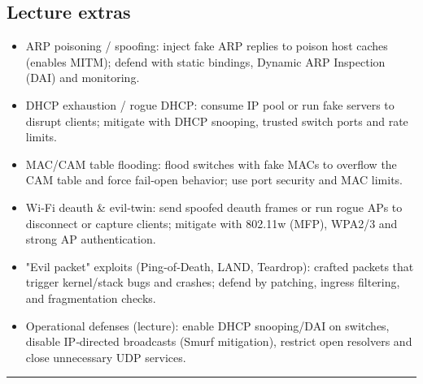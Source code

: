 \documentclass{article}
\begin{document}
\subsection{Lecture extras}
\begin{itemize}
  \item ARP poisoning / spoofing: inject fake ARP replies to poison host caches (enables MITM); defend with static bindings, Dynamic ARP Inspection (DAI) and monitoring.
  \item DHCP exhaustion / rogue DHCP: consume IP pool or run fake servers to disrupt clients; mitigate with DHCP snooping, trusted switch ports and rate limits.
  \item MAC/CAM table flooding: flood switches with fake MACs to overflow the CAM table and force fail‑open behavior; use port security and MAC limits.
  \item Wi‑Fi deauth \& evil‑twin: send spoofed deauth frames or run rogue APs to disconnect or capture clients; mitigate with 802.11w (MFP), WPA2/3 and strong AP authentication.
  \item "Evil packet" exploits (Ping‑of‑Death, LAND, Teardrop): crafted packets that trigger kernel/stack bugs and crashes; defend by patching, ingress filtering, and fragmentation checks.
  \item Operational defenses (lecture): enable DHCP snooping/DAI on switches, disable IP‑directed broadcasts (Smurf mitigation), restrict open resolvers and close unnecessary UDP services.
\end{itemize}

\hrule
\end{document}
